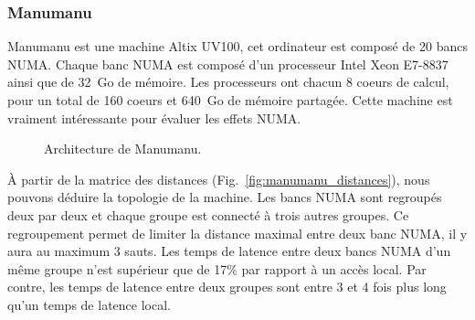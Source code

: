 \subsubsection{Manumanu}
Manumanu est une machine Altix UV100, cet ordinateur est composé de 20 bancs NUMA.
%
Chaque banc NUMA est composé d'un processeur Intel Xeon E7-8837 ainsi que de 32~Go de mémoire.
%
Les processeurs ont chacun 8 coeurs de calcul, pour un total de 160 coeurs et 640~Go de mémoire partagée.
%
Cette machine est vraiment intéressante pour évaluer les effets NUMA.

\begin{figure}[!h]
     \begin{center}
    \end{center}
    \caption{Architecture de Manumanu.}
    \label{fig:manumanu}
\end{figure}

\`{A} partir de la matrice des distances (Fig.~\ref{fig:manumanu_distances}), nous pouvons déduire la topologie de la machine.
%
Les bancs NUMA sont regroupés deux par deux et chaque groupe est connecté à trois autres groupes.
%
Ce regroupement permet de limiter la distance maximal entre deux banc NUMA, il y aura au maximum 3 sauts.
%
Les temps de latence entre deux bancs NUMA d'un même groupe n'est supérieur que de 17\% par rapport à un accès local.
%
Par contre, les temps de latence entre deux groupes sont entre 3 et 4 fois plus long qu'un temps de latence local.
